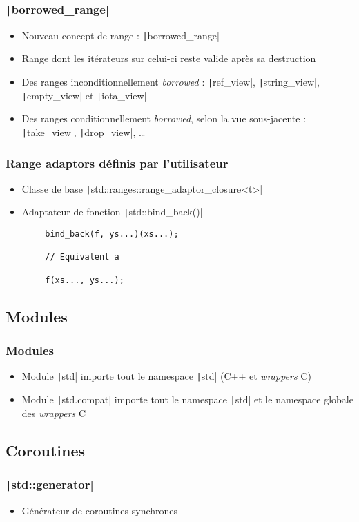 \documentclass[C++.tex]{subfiles}
\begin{document}
\begin{frame}[fragile]
	\frametitle{\texttt|borrowed_range|}
	\begin{itemize}
		\item Nouveau concept de range : \texttt|borrowed_range|
		\item Range dont les itérateurs sur celui-ci reste valide après sa destruction
		\item Des ranges inconditionnellement \textit{borrowed} : \texttt|ref_view|, \texttt|string_view|, \texttt|empty_view| et \texttt|iota_view|
		\item Des ranges conditionnellement \textit{borrowed}, selon la vue sous-jacente : \texttt|take_view|, \texttt|drop_view|, \ldots{}
	\end{itemize}
\end{frame}

\begin{frame}[fragile]
	\frametitle{Range adaptors définis par l'utilisateur}
	\begin{itemize}
		\item Classe de base \texttt|std::ranges::range_adaptor_closure<t>|
		\item Adaptateur de fonction \texttt|std::bind_back()|
	\end{itemize}

	\begin{verbatim}
		bind_back(f, ys...)(xs...);

		// Equivalent a

		f(xs..., ys...);
	\end{verbatim}
\end{frame}

\subsection*{Modules}
\begin{frame}[fragile]
	\frametitle{Modules}
	\begin{itemize}
		\item Module \texttt|std| importe tout le namespace \texttt|std| (C++ et \textit{wrappers} C)
		\item Module \texttt|std.compat| importe tout le namespace \texttt|std| et le namespace globale des \textit{wrappers} C
	\end{itemize}
\end{frame}

\subsection*{Coroutines}
\begin{frame}[fragile]
	\frametitle{\texttt|std::generator|}
	\begin{itemize}
		\item Générateur de coroutines synchrones
	\end{itemize}
\end{frame}
\end{document}
